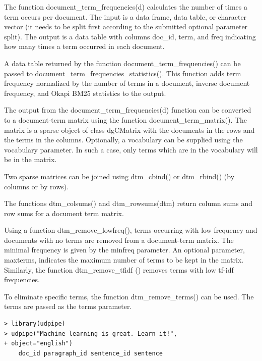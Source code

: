 \documentclass[10pt]{book}
\begin{document}
The function document\_term\_frequencies(d) calculates the number of times a term occurs per document. The input is a data frame, data table, or character vector (it needs to be split first according to the submitted optional parameter split). The output is a data table with columns doc\_id, term, and freq indicating how many times a term occurred in each document.

A data table returned by the function document\_term\_frequencies() can be passed to document\_term\_frequencies\_statistics(). This function adds term frequency normalized by the number of terms in a document, inverse document frequency, and Okapi BM25 statistics to the output.

The output from the document\_term\_frequencies(d) function can be converted to a document-term matrix using the function document\_term\_matrix(). The matrix is a sparse object of class dgCMatrix with the documents in the rows and the terms in the columns. Optionally, a vocabulary can be supplied using the vocabulary parameter. In such a case, only terms which are in the vocabulary will be in the matrix.

Two sparse matrices can be joined using dtm\_cbind() or dtm\_rbind() (by columns or by rows).

The functions dtm\_colsums() and dtm\_rowsums(dtm) return column sums and row sums for a document term matrix.

Using a function dtm\_remove\_lowfreq(), terms occurring with low frequency and documents with no terms are removed from a document-term matrix. The minimal frequency is given by the minfreq parameter. An optional parameter, maxterms, indicates the maximum number of terms to be kept in the matrix. Similarly, the function dtm\_remove\_tfidf () removes terms with low tf-idf frequencies.

To eliminate specific terms, the function dtm\_remove\_terms() can be used. The terms are passed as the terms parameter.

\begin{verbatim}
> library(udpipe)
> udpipe("Machine learning is great. Learn it!",
+ object="english")
    doc_id paragraph_id sentence_id sentence
\end{verbatim}
\end{document}
